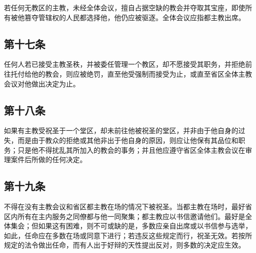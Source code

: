 若任何无教区的主教，未经全体会议，擅自占据空缺的教会并夺取其宝座，即使所有被他篡夺管辖权的人民都选择他，他仍应被驱逐。全体会议应指都主教出席。\par

\par


\subsection{第十七条}

任何人若已接受主教圣秩，并被委任管理一个教区，却不愿接受其职务，并拒绝前往托付给他的教会，则应被绝罚，直至他受强制而接受为止，或直至省区全体主教会议对他做出决定为止。\par


\subsection{第十八条}

如果有主教受祝圣于一个堂区，却未前往他被祝圣的堂区，并非由于他自身的过失，而是由于教众的拒绝或其他非出于他自身的原因，则应让他保有其品位和职务；只是他不得扰乱其所加入的教会的事务；并且他应遵守省区全体主教会议在审理案件后所做的任何决定。\par


\subsection{第十九条}

不得在没有主教会议和省区都主教在场的情况下被祝圣。当都主教在场时，最好省区内所有在主内服务之同僚都与他一同聚集；都主教应以书信邀请他们。最好是全体集会；但如果这有困难，则不可或缺的是，多数应亲自出席或以书信参与选举，如此，任命应在多数在场或同意下进行；若违反这些规定而行，祝圣无效。若按所规定的法令做出任命，而有人出于好辩的天性提出反对，则多数的决定应生效。\par

\par

